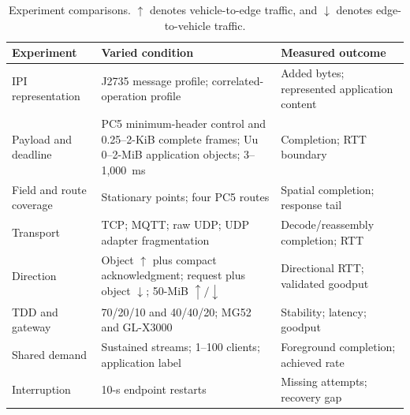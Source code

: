 \begin{table}[t]
  \caption{Experiment comparisons. $\uparrow$ denotes vehicle-to-edge traffic,
  and $\downarrow$ denotes edge-to-vehicle traffic.}
  \label{tab:core-matrix}
  \centering
  \scriptsize
  \setlength{\tabcolsep}{3pt}
  \renewcommand{\arraystretch}{1.12}
  \begin{tabular}{@{}C{0.20\textwidth}C{0.38\textwidth}C{0.34\textwidth}@{}}
    \toprule
    Experiment & Varied condition & Measured outcome \\
    \midrule
    IPI representation & J2735 message profile; correlated-operation profile & Added bytes; represented application content \\
    Payload and deadline & PC5 minimum-header control and 0.25--2-KiB complete frames; Uu 0--2-MiB application objects; 3--1,000~ms & Completion; RTT boundary \\
    Field and route coverage & Stationary points; four PC5 routes & Spatial completion; response tail \\
    Transport & TCP; MQTT; raw UDP; UDP adapter fragmentation & Decode/reassembly completion; RTT \\
    Direction & Object $\uparrow$ plus compact acknowledgment; request plus object $\downarrow$; 50-MiB $\uparrow/\downarrow$ & Directional RTT; validated goodput \\
    TDD and gateway & 70/20/10 and 40/40/20; MG52 and GL-X3000 & Stability; latency; goodput \\
    Shared demand & Sustained streams; 1--100 clients; application label & Foreground completion; achieved rate \\
    Interruption & 10-s endpoint restarts & Missing attempts; recovery gap \\
    \bottomrule
  \end{tabular}
\end{table}

